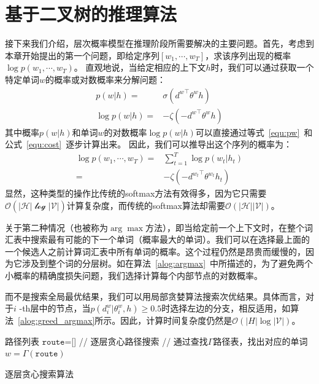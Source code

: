 \section{基于二叉树的推理算法}
接下来我们介绍，层次概率模型在推理阶段所需要解决的主要问题。首先，考虑到本章开始提出的第一个问题，即给定序列$ [w_1,\cdots,w_T] $，求该序列出现的概率$   \log p(w_1,\cdots, w_T)$。 直观地说，当给定相应的上下文$ h $时，我们可以通过获取一个特定单词$ w $的概率或对数概率来分解问题：
\begin{equation}
\begin{split}
    p(w|h) =&\sigma({d^w}^\top \theta^w h)\\
   \log p(w|h) =& -\zeta(- {d^{w}}^\top \theta^{w} h )
\end{split}
\end{equation}
其中概率$ p(w | h)$和单词$ w $的对数概率$ \log p(w | h)$可以直接通过等式~\ref{equ:pw}~和公式~\ref{equ:cost}~逐步计算出来。 因此，我们可以推导出这个序列的概率为：
\begin{equation}
\begin{split}
   \log p(w_1,\cdots, w_T)=&\sum_{t=1}^T\log p(w_t|h_t) \\
   =& -\zeta(- {d^{w_t}}^\top \theta^{w_t} h_t )
\end{split}
\end{equation}
显然，这种类型的操作比传统的softmax方法有效得多，因为它只需要$\mathcal{O}(\mathcal {| H | \log| V |})$计算复杂度，而传统的softmax算法却需要$\mathcal{O}(\mathcal {| H || V |})$。

关于第二种情况（也被称为$\arg\max $方法），即当给定前一个上下文时，在整个词汇表中搜索最有可能的下一个单词（概率最大的单词）。我们可以在选择最上面的一个候选人之前计算词汇表中所有单词的概率。这个过程仍然是昂贵而缓慢的，因为它涉及到整个词的分层树。如在算法~\ref{alog:argmax}~中所描述的，为了避免两个小概率的精确度损失问题，我们选择计算每个内部节点的对数概率。

而不是搜索全局最优结果，我们可以用局部贪婪算法搜索次优结果。具体而言，对于$ i $ -th层中的节点，当$ p(d ^ w_i | \theta_{i} ^ w,h)\ge 0.5 $时选择左边的分支，相反适用，如算法~\ref{alog:greed_argmax}所示。因此，计算时间复杂度仍然是$ \mathcal{O}(| H | \log \mathcal {| V |})$。


\begin{algorithm}[!ht]
\SetAlgoLined
{}
 路径列表 $\mathtt{route}$=[] \;
 {// 逐层贪心路径搜索}\;
{// 通过查找$\Gamma$路径表，找出对应的单词}\;
$w=\Gamma(\mathtt{route})$\;
\caption{逐层贪心搜索算法}\label{alog:greed_argmax}
\end{algorithm}


